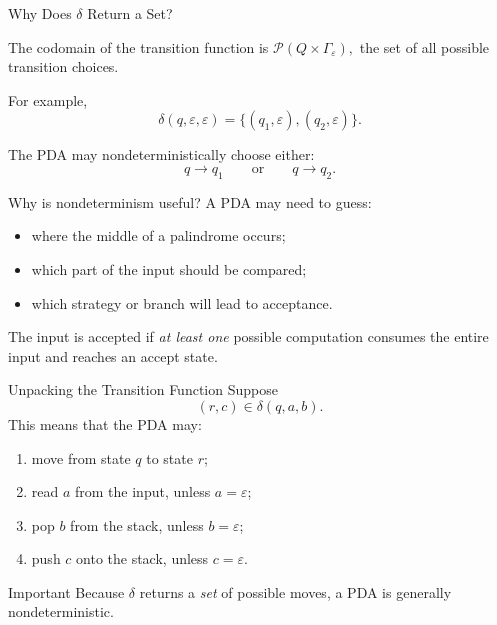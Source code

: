 \documentclass[aspectratio=169,10pt]{beamer}
\newcommand{\eps}{\varepsilon}
\newcommand{\Pow}{\mathcal{P}}
\begin{document}
\begin{frame}{Why Does \(\delta\) Return a Set?}

\small
The codomain of the transition function is
\(
\Pow(Q\times\Gamma_{\eps}),
\)
the set of all possible transition choices.

For example,
\[
\delta(q,\eps,\eps)
=
\{(q_1,\eps),(q_2,\eps)\}.
\]

The PDA may nondeterministically choose either:
\[
q\longrightarrow q_1
\qquad\text{or}\qquad
q\longrightarrow q_2.
\]

\begin{block}{Why is nondeterminism useful?}
A PDA may need to guess:

\begin{itemize}
    \item where the middle of a palindrome occurs;
    \item which part of the input should be compared;
    \item which strategy or branch will lead to acceptance.
\end{itemize}
\end{block}

The input is accepted if \emph{at least one} possible computation
consumes the entire input and reaches an accept state.

\end{frame}

\begin{frame}{Unpacking the Transition Function}
Suppose
\[
(r,c)\in\delta(q,a,b).
\]
This means that the PDA may:

\begin{enumerate}
    \item move from state $q$ to state $r$;
    \item read $a$ from the input, unless $a=\eps$;
    \item pop $b$ from the stack, unless $b=\eps$;
    \item push $c$ onto the stack, unless $c=\eps$.
\end{enumerate}

\begin{alertblock}{Important}
Because $\delta$ returns a \emph{set} of possible moves, a PDA is generally nondeterministic.
\end{alertblock}
\end{frame}
\end{document}
